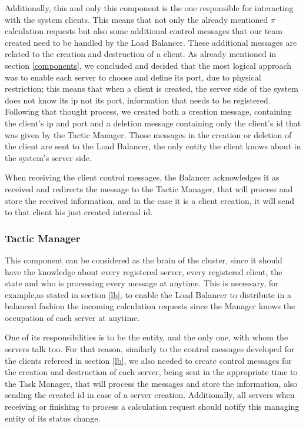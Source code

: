 \documentclass[12pt]{article}
\begin{document}
Additionally, this and only this component is the one responsible for interacting with the system clients. This means that not only the already mentioned $\pi$ calculation requests but also some additional control messages that our team created need to be handled by the Load Balancer. These additional messages are related to the creation and destruction of a client. As already mentioned in section \ref{components}, we concluded and decided that the most logical approach was to enable each server to choose and define its port, due to physical restriction; this means that when a client is created, the server side of the system does not know its ip not its port, information that needs to be registered. Following that thought process, we created both a creation message, containing the client's ip and port and a deletion message containing only the client's id that was given by the Tactic Manager. Those messages in the creation or deletion of the client are sent to the Load Balancer, the only entity the client knows about in the system's server side.

When receiving the client control messages, the Balancer acknowledges it as received and redirects the message to the Tactic Manager, that will process and store the received information, and in the case it is a client creation, it will send to that client his just created internal id.

\subsubsection{Tactic Manager} \label{tm}
This component can be considered as the brain of the cluster, since it should have the knowledge about every registered server, every registered client, the state and who is processing every message at anytime. This is necessary, for example,as stated in section \ref{lb}, to enable the Load Balancer to distribute in a balanced fashion the incoming calculation requests since the Manager knows the occupation of each server at anytime.

One of its responsibilities is to be the entity, and the only one, with whom the servers talk too. For that reason, similarly to the control messages developed for the clients refereed in section \ref{lb}, we also needed to create control messages for the creation and destruction of each server, being sent in the appropriate time to the Task Manager, that will process the messages and store the information, also sending the created id in case of a server creation. Additionally, all servers when receiving or finishing to process a calculation request should notify this managing entity of its status change.
\end{document}
